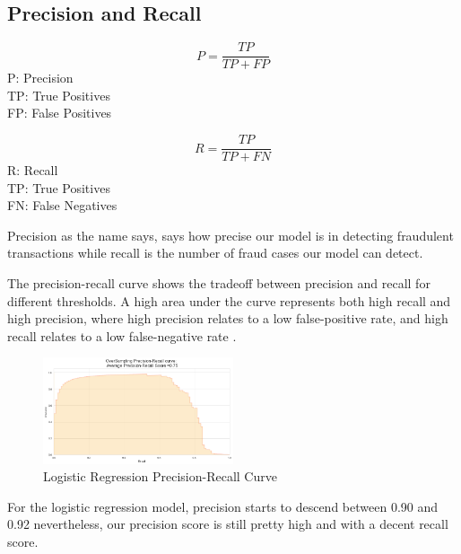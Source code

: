 \documentclass[conference]{IEEEtran}
\begin{document}
\subsection{Precision and Recall}

\begin{center}
  \begin{equation} \label{eq:precision}
    P = \frac{TP}{TP + FP}
  \end{equation}
  P: Precision \\
  TP: True Positives \\
  FP: False Positives
\end{center}

\begin{center}
  \begin{equation} \label{eq:recall}
    R = \frac{TP}{TP + FN}
  \end{equation}
  R: Recall \\
  TP: True Positives \\
  FN: False Negatives
\end{center}

Precision as the name says, says how precise our model is in detecting fraudulent transactions while recall is the number of fraud cases our model can detect.

The precision-recall curve shows the tradeoff between precision and recall for different thresholds. A high area under the curve represents both high recall and high precision, where high precision relates to a low false-positive rate, and high recall relates to a low false-negative rate \cite{sklearn_prec_rec}.

\begin{figure}[H]
    \centering\includegraphics[width=0.5\textwidth]{images/prec_rec.png}
    \caption{Logistic Regression Precision-Recall Curve}
    \label{fig:prec_rec}
\end{figure}

For the logistic regression model, precision starts to descend between 0.90 and 0.92 nevertheless, our precision score is still pretty high and with a decent recall score.
\end{document}

